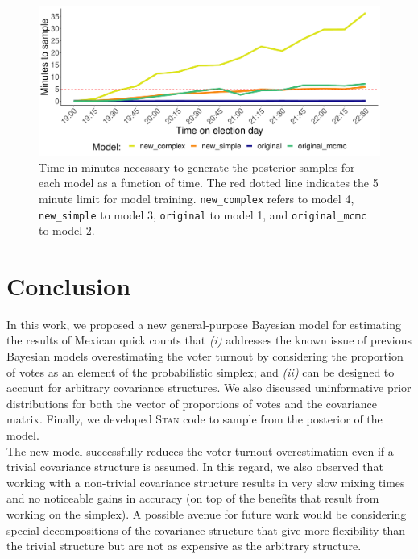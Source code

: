\documentclass{article}
\begin{document}
\begin{figure}[h]
  \centering
  \includegraphics[width=\textwidth]{../fig/times.pdf}
  \caption{Time in minutes necessary to generate the posterior samples for each model as a function of time. The red dotted line indicates the 5 minute limit for model training. \texttt{new\_complex} refers to model 4, \texttt{new\_simple} to model 3, \texttt{original} to model 1, and \texttt{original\_mcmc} to model 2.}
  \label{fig:times}
\end{figure}




\section{Conclusion} \label{sec:conclusion}


In this work, we proposed a new general-purpose Bayesian model for estimating the results of Mexican quick counts that \textit{(i)} addresses the known issue of previous Bayesian models overestimating the voter turnout by considering the proportion of votes as an element of the probabilistic simplex; and \textit{(ii)} can be designed to account for arbitrary covariance structures. We also discussed uninformative prior distributions for both the vector of proportions of votes and the covariance matrix. Finally, we developed \textsc{Stan} code to sample from the posterior of the model.
\\

The new model successfully reduces the voter turnout overestimation even if a trivial covariance structure is assumed. In this regard, we also observed that working with a non-trivial covariance structure results in very slow mixing times and no noticeable gains in accuracy (on top of the benefits that result from working on the simplex). A possible avenue for future work would be considering special decompositions of the covariance structure that give more flexibility than the trivial structure but are not as expensive as the arbitrary structure.
\\
\end{document}
